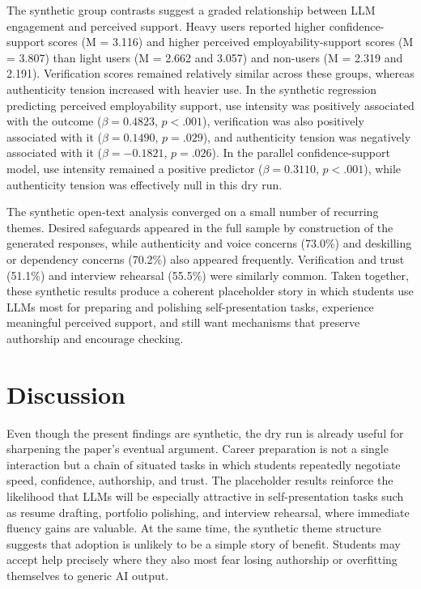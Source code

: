 \documentclass[sigconf]{acmart}
\begin{document}
The synthetic group contrasts suggest a graded relationship between LLM engagement and perceived support. Heavy users reported higher confidence-support scores (M = 3.116) and higher perceived employability-support scores (M = 3.807) than light users (M = 2.662 and 3.057) and non-users (M = 2.319 and 2.191). Verification scores remained relatively similar across these groups, whereas authenticity tension increased with heavier use. In the synthetic regression predicting perceived employability support, use intensity was positively associated with the outcome ($\beta = 0.4823$, $p < .001$), verification was also positively associated with it ($\beta = 0.1490$, $p = .029$), and authenticity tension was negatively associated with it ($\beta = -0.1821$, $p = .026$). In the parallel confidence-support model, use intensity remained a positive predictor ($\beta = 0.3110$, $p < .001$), while authenticity tension was effectively null in this dry run.

The synthetic open-text analysis converged on a small number of recurring themes. Desired safeguards appeared in the full sample by construction of the generated responses, while authenticity and voice concerns (73.0\%) and deskilling or dependency concerns (70.2\%) also appeared frequently. Verification and trust (51.1\%) and interview rehearsal (55.5\%) were similarly common. Taken together, these synthetic results produce a coherent placeholder story in which students use LLMs most for preparing and polishing self-presentation tasks, experience meaningful perceived support, and still want mechanisms that preserve authorship and encourage checking.

\section{Discussion}
Even though the present findings are synthetic, the dry run is already useful for sharpening the paper's eventual argument. Career preparation is not a single interaction but a chain of situated tasks in which students repeatedly negotiate speed, confidence, authorship, and trust. The placeholder results reinforce the likelihood that LLMs will be especially attractive in self-presentation tasks such as resume drafting, portfolio polishing, and interview rehearsal, where immediate fluency gains are valuable. At the same time, the synthetic theme structure suggests that adoption is unlikely to be a simple story of benefit. Students may accept help precisely where they also most fear losing authorship or overfitting themselves to generic AI output.
\end{document}
